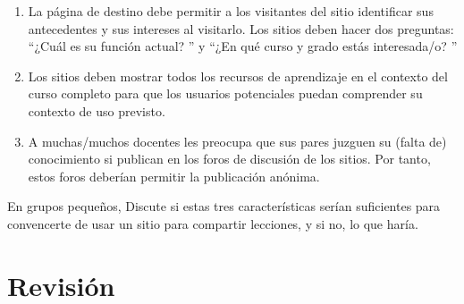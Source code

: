 \begin{enumerate}
 
\item
  La página de destino debe permitir a los visitantes del sitio
identificar sus antecedentes y sus intereses al visitarlo.
Los sitios deben hacer dos preguntas:
``¿Cuál es su función actual? '' y
``¿En qué curso y grado estás interesada/o? ''
 
\item
  Los sitios deben mostrar todos los recursos de aprendizaje
en el contexto del curso completo para que los usuarios potenciales puedan comprender
su contexto de uso previsto.
 
\item
  A muchas/muchos docentes les preocupa que sus pares
juzguen su (falta de) conocimiento si publican en los foros de discusión
de los sitios.
Por tanto, estos foros deberían permitir la publicación anónima.
\end{enumerate}

En grupos pequeños,
Discute si estas tres características serían
suficientes para convencerte de usar un sitio para compartir lecciones,
y si no,
lo que haría.

 
\section*{Revisión}
 
